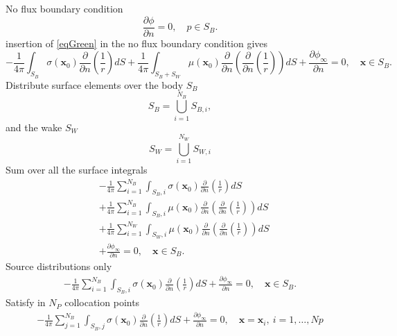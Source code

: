 \documentclass[]{book}
\newcommand{\V}[1]{\boldsymbol{#1}}
\newcommand{\nn}{\nonumber}
\begin{document}
No flux boundary condition
\begin{equation}
\frac{\partial \phi}{\partial n} = 0, \quad p \in S_B.
\end{equation}
insertion of \ref{eqGreen} in the no flux boundary condition gives
\begin{equation}
 	- \frac{1}{4 \pi}  \int_{S_B} \sigma (\V{x}_0) \frac{\partial }{\partial n}\left(\frac{1}{r} \right) dS
+ \frac{1}{4 \pi} \int_{S_B + S_W} \mu(\V{x}_0) \frac{\partial }{\partial n} \left(  \frac{\partial }{\partial n} \left( \frac{1}{r}\right) \right) dS	
+ \frac{\partial \phi_{\infty} }{\partial n} = 0, \quad \V{x} \in S_B.
\end{equation}
Distribute surface elements over the body $S_B$
\begin{equation}
S_B = \bigcup_{i=1}^{N_{B}} S_{B,i},
\end{equation}
and the wake $S_W$
\begin{equation}
S_W = \bigcup_{i=1}^{N_{W}} S_{W,i}
\end{equation}
Sum over all the surface integrals
\begin{align}
&- \frac{1}{4 \pi} \sum_{i=1}^{N_B}  \int_{S_B,i} \sigma (\V{x}_0) \frac{\partial }{\partial n}\left(\frac{1}{r} \right) dS \nn \\
&+ \frac{1}{4 \pi} \sum_{i=1}^{N_B}\int_{S_B,i} \mu(\V{x}_0) \frac{\partial }{\partial n} \left(  \frac{\partial }{\partial n} \left( \frac{1}{r}\right) \right) dS \nn \\
&+ \frac{1}{4 \pi} \sum_{i=1}^{N_W}\int_{S_W,i} \mu(\V{x}_0) \frac{\partial }{\partial n} \left(  \frac{\partial }{\partial n} \left( \frac{1}{r}\right) \right) dS \nn	\\
&+ \frac{\partial \phi_{\infty} }{\partial n} = 0, \quad \V{x} \in S_B.
\end{align}
Source distributions only
\begin{align}
- \frac{1}{4 \pi} \sum_{i=1}^{N_B}  \int_{S_B,i} \sigma (\V{x}_0) \frac{\partial }{\partial n}\left(\frac{1}{r} \right) dS \nn + \frac{\partial \phi_{\infty} }{\partial n} = 0, \quad \V{x} \in S_B.
\end{align}
Satisfy in $N_P$ collocation points
\begin{align}
- \frac{1}{4 \pi} \sum_{j=1}^{N_B}  \int_{S_B,j} \sigma (\V{x}_0) \frac{\partial }{\partial n}\left(\frac{1}{r} \right) dS \nn + \frac{\partial \phi_{\infty} }{\partial n} = 0, \quad \V{x}= \V{x}_i,  ~i=1,\ldots,Np
\end{align}
\end{document}
